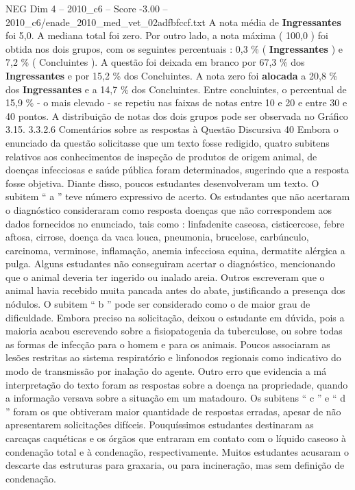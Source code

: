 \begin{textsample}{NEG Dim 4 – 2010\_c6 – Score -3.00 – 2010\_c6/enade\_2010\_med\_vet\_02adfbfccf.txt}
A nota média de \textbf{Ingressantes} foi 5,0.
A mediana total foi zero.
Por outro lado, a nota máxima ( 100,0 ) foi obtida nos dois grupos, com os seguintes percentuais : 0,3 \% ( \textbf{Ingressantes} ) e 7,2 \% ( Concluintes ).
A questão foi deixada em branco por 67,3 \% dos \textbf{Ingressantes} e por 15,2 \% dos Concluintes.
A nota zero foi \textbf{alocada} a 20,8 \% dos \textbf{Ingressantes} e a 14,7 \% dos Concluintes.
Entre concluintes, o percentual de 15,9 \% - o mais elevado - se repetiu nas faixas de notas entre 10 e 20 e entre 30 e 40 pontos.
A distribuição de notas dos dois grupos pode ser observada no Gráfico 3.15. 3.3.2.6 Comentários sobre as respostas à Questão Discursiva 40 Embora o enunciado da questão solicitasse que um texto fosse redigido, quatro subitens relativos aos conhecimentos de inspeção de produtos de origem animal, de doenças infecciosas e saúde pública foram determinados, sugerindo que a resposta fosse objetiva.
Diante disso, poucos estudantes desenvolveram um texto.
O subitem “ a ” teve número expressivo de acerto.
Os estudantes que não acertaram o diagnóstico consideraram como resposta doenças que não correspondem aos dados fornecidos no enunciado, tais como : linfadenite caseosa, cisticercose, febre aftosa, cirrose, doença da vaca louca, pneumonia, brucelose, carbúnculo, carcinoma, verminose, inflamação, anemia infecciosa equina, dermatite alérgica a pulga.
Alguns estudantes não conseguiram acertar o diagnóstico, mencionando que o animal deveria ter ingerido ou inalado areia.
Outros escreveram que o animal havia recebido muita pancada antes do abate, justificando a presença dos nódulos.
O subitem “ b ” pode ser considerado como o de maior grau de dificuldade.
Embora preciso na solicitação, deixou o estudante em dúvida, pois a maioria acabou escrevendo sobre a fisiopatogenia da tuberculose, ou sobre todas as formas de infecção para o homem e para os animais.
Poucos associaram as lesões restritas ao sistema respiratório e linfonodos regionais como indicativo do modo de transmissão por inalação do agente.
Outro erro que evidencia a má interpretação do texto foram as respostas sobre a doença na propriedade, quando a informação versava sobre a situação em um matadouro.
Os subitens “ c ” e “ d ” foram os que obtiveram maior quantidade de respostas erradas, apesar de não apresentarem solicitações difíceis.
Pouquíssimos estudantes destinaram as carcaças caquéticas e os órgãos que entraram em contato com o líquido caseoso à condenação total e à condenação, respectivamente.
Muitos estudantes acusaram o descarte das estruturas para graxaria, ou para incineração, mas sem definição de condenação.

\end{textsample}
